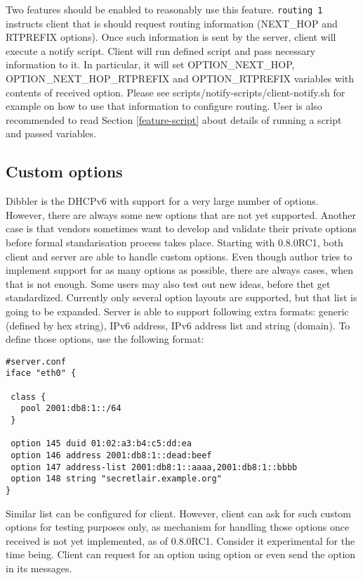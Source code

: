 Two features should be enabled to reasonably use this
feature. \verb+routing 1+ instructs client that is should request routing
information (NEXT\_HOP and RTPREFIX options). Once such information is
sent by the server, client will execute a notify script. Client will
run defined script and pass necessary information to it. In
particular, it will set OPTION\_NEXT\_HOP, OPTION\_NEXT\_HOP\_RTPREFIX
and OPTION\_RTPREFIX variables with contents of received
option. Please see scripts/notify-scripts/client-notify.sh for example
on how to use that information to configure routing. User is also
recommended to read Section \ref{feature-script} about details of
running a script and passed variables.

\subsection{Custom options}
\label{feature-custom-options}
Dibbler is the DHCPv6 with support for a very large number of
options. However, there are always some new options that are not yet
supported. Another case is that vendors sometimes want to develop
and validate their private options before formal standarisation
process takes place. Starting with 0.8.0RC1, both client and server
are able to handle custom options. Even though author tries to
implement support for as many options as possible, there are always
cases, when that is not
enough. Some users may also test out new ideas, before thet get
standardized. Currently only several option layouts are supported, but
that list is going to be expanded. Server is able to support
following extra formats: generic (defined by hex string), IPv6
address, IPv6 address list and string (domain). To define those
options, use the following format:

\begin{lstlisting}
#server.conf
iface "eth0" {

 class {
   pool 2001:db8:1::/64
 }

 option 145 duid 01:02:a3:b4:c5:dd:ea
 option 146 address 2001:db8:1::dead:beef
 option 147 address-list 2001:db8:1::aaaa,2001:db8:1::bbbb
 option 148 string "secretlair.example.org"
}
\end{lstlisting}

Similar list can be configured for client. However, client can ask
for such custom options for testing purposes only, as mechanism for
handling those options once received is not yet implemented, as of
0.8.0RC1. Consider it experimental for the time being. Client can
request for an option using  option or even send the option
in its messages.

